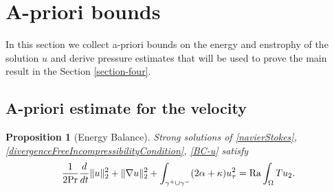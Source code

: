 \documentclass{article}
\newtheorem{proposition}[theorem]{Proposition}
\theoremstyle{definition}
\theoremstyle{definition}
\newcommand{\Pra}{\rm{Pr}}
\newcommand{\Ra}{{\rm{Ra}}}
\begin{document}
\section{A-priori bounds}\label{Section-A-Priori-Bounds}
In this section we collect a-priori bounds on the energy and enstrophy of the solution $u$ and derive pressure estimates that will be used to prove the main result in the Section \ref{section-four}. 

\subsection{A-priori estimate for the velocity}
%
\begin{proposition}[Energy Balance]
Strong solutions of \eqref{navierStokes}, \eqref{divergenceFreeIncompressibilityCondition}, \eqref{BC-u} satisfy
\begin{align}
    \label{energy-balance}
    \frac{1}{2 \Pra} \frac{d}{dt}\|u\|_2^2 + \|\nabla u\|_2^2 + \int_{\gamma^+\cup \gamma^-} (2\alpha+\kappa) u_\tau^2= \Ra\int_{\Omega} T u_2.
\end{align}
\end{proposition}
\end{document}
